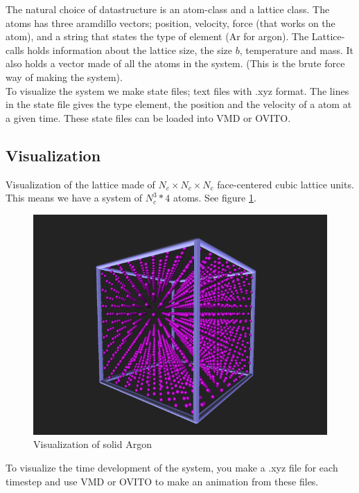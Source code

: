 The natural choice of datastructure is an atom-class and a lattice class.  The atoms has three aramdillo vectors; position, velocity, force (that works on the atom), and a string that states the type of element (Ar for argon). The Lattice-calls
holds information about the lattice size, the size $b$, temperature and mass. It also holds a vector made of all the atoms in the system. (This is the brute force way of making the system).\\
To visualize the system we make state files; text files with .xyz format. The lines in the state file gives the type element, the position and the velocity of a atom at a given time. These state files can be loaded into VMD or OVITO.
\subsection{Visualization}
Visualization of the lattice made of $N_c \times N_c \times N_c$ face-centered cubic lattice units. This means we have a system of $N_c^3*4$ atoms. See figure \ref{a}.
\begin{figure}[H]
 \centering
 \includegraphics[width=9 cm]{./figures/exerciseA.png}
 \caption{Visualization of solid Argon}
 \label{a}
\end{figure}
To visualize the time development of the system, you make a .xyz file for each timestep and use VMD or OVITO to make an animation from these files.
